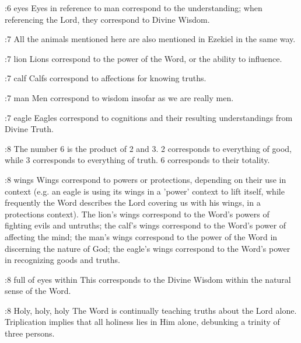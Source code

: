 :6 {eyes}
Eyes in reference to man correspond to the understanding; when referencing the Lord, they correspond to Divine Wisdom.

:7 {}
All the animals mentioned here are also mentioned in Ezekiel in the same way.

:7 {lion}
Lions correspond to the power of the Word, or the ability to influence.

:7 {calf}
Calfs correspond to affections for knowing truths.

:7 {man}
Men correspond to wisdom insofar as we are really men.

:7 {eagle}
Eagles correspond to cognitions and their resulting understandings from Divine Truth.

:8 {}
The number 6 is the product of 2 and 3. 2 corresponds to everything of good, while 3 corresponds to everything of truth. 6 corresponds to their totality.

:8 {wings}
Wings correspond to powers or protections, depending on their use in context (e.g. an eagle is using its wings in a 'power' context to lift itself, while frequently the Word describes the Lord covering us with his wings, in a protections context). The lion's wings correspond to the Word's powers of fighting evils and untruths; the calf's wings correspond to the Word's power of affecting the mind; the man's wings correspond to the power of the Word in discerning the nature of God; the eagle's wings correspond to the Word's power in recognizing goods and truths.

:8 {full of eyes within}
This corresponds to the Divine Wisdom within the natural sense of the Word.

:8 {Holy, holy, holy}
The Word is continually teaching truths about the Lord alone. Triplication implies that all holiness lies in Him alone, debunking a trinity of three persons.

